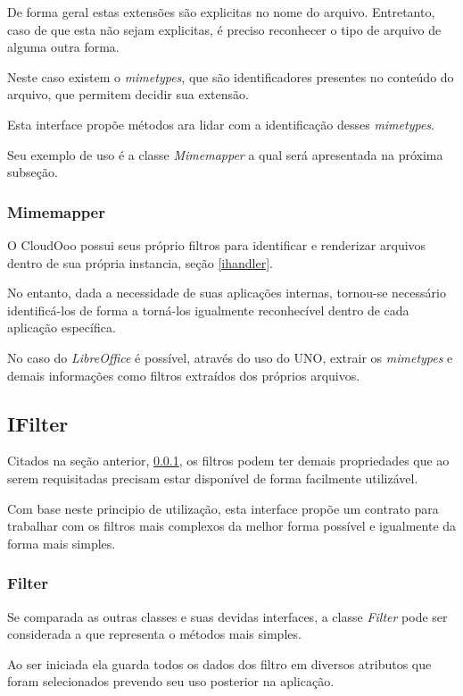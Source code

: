 {De forma geral estas extensões são explicitas no nome do arquivo. Entretanto, caso de que esta não sejam explicitas, é preciso reconhecer o tipo de arquivo de alguma outra forma. 

Neste caso existem o \textit{mimetypes}, que são identificadores presentes no conteúdo do arquivo, que permitem decidir sua extensão. 

Esta interface propõe métodos ara lidar com a identificação desses \textit{mimetypes}.

Seu exemplo de uso é a classe \textit{Mimemapper} a qual será apresentada na próxima subseção.


\subsubsection{Mimemapper}
\label{mimemapper}

O CloudOoo possui seus próprio filtros para identificar e renderizar arquivos dentro de sua própria instancia, seção \ref{ihandler}.

No entanto, dada a necessidade de suas aplicações internas, tornou-se necessário identificá-los de forma a torná-los igualmente reconhecível dentro de cada aplicação específica.

No caso do \textit{LibreOffice} é possível, através do uso do UNO, extrair os \textit{mimetypes} e demais informações como filtros extraídos dos próprios arquivos.


\subsection{IFilter}

Citados na seção anterior, \ref{mimemapper}, os filtros podem ter demais propriedades que ao serem requisitadas precisam estar disponível de forma facilmente utilizável.

Com base neste principio de utilização, esta interface propõe um contrato para trabalhar com os filtros mais complexos da melhor forma possível e igualmente da forma mais simples.


\subsubsection{Filter}

Se comparada as outras classes e suas devidas interfaces, a classe \textit{Filter} pode ser considerada a que representa o métodos mais simples.

Ao ser iniciada ela guarda todos os dados dos filtro em diversos atributos que foram selecionados prevendo seu uso posterior na aplicação.


}
